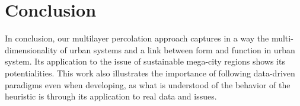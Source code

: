 \documentclass{jimis-en}
\begin{document}
  

\section{Conclusion}


In conclusion, our multilayer percolation approach captures in a way the multi-dimensionality of urban systems and a link between form and function in urban system. Its application to the issue of sustainable mega-city regions shows its potentialities. This work also illustrates the importance of following data-driven paradigms even when developing, as what is understood of the behavior of the heuristic is through its application to real data and issues.



























%

\end{document}
